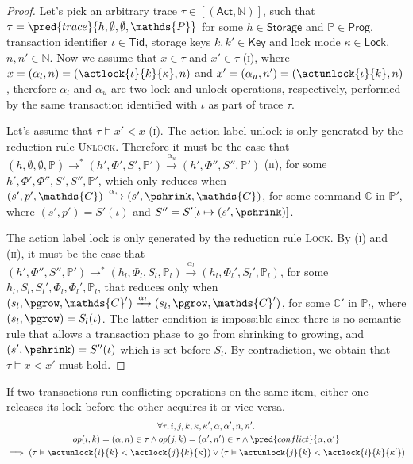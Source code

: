 \begin{proof}
Let's pick an arbitrary trace $\tau \in [(\mathsf{Act}, \mathds{N})]$, such that $\tau = \pred{trace}{h, \emptyset, \emptyset, \mathds{P}}$ for some $h \in \mathsf{Storage}$ and $\mathds{P} \in \mathsf{Prog}$, transaction identifier $\iota \in \mathsf{Tid}$, storage keys $k, k' \in \mathsf{Key}$ and lock mode $\kappa \in \mathsf{Lock}$, $n, n' \in \mathds{N}$. Now we assume that  $x \in \tau$ and $x' \in \tau$ (\textsc{i}), where $x = (\alpha_l, n) = (\actlock{\iota}{k}{\kappa}, n)$ and $x' = (\alpha_u, n') = (\actunlock{\iota}{k}, n)$, therefore $\alpha_l$ and $\alpha_u$ are two lock and unlock operations, respectively, performed by the same transaction identified with $\iota$ as part of trace $\tau$.

Let's assume that $\tau \vDash x' < x$ (\textsc{i}). The action label \textsf{unlock} is only generated by the reduction rule \textsc{Unlock}. Therefore it must be the case that $(h, \emptyset, \emptyset, \mathds{P}) \rightarrow^* (h', \Phi', S', \mathds{P}') \xrightarrow{\alpha_u} (h', \Phi'', S'', \mathds{P}')$ (\textsc{ii}), for some $h', \Phi', \Phi'', S', S'', \mathds{P}'$, which only reduces when $(s', p', \mathds{C}) \xrightarrow{\alpha_u} (s', \pshrink, \mathds{C})$, for some command $\mathds{C}$ in $\mathds{P}'$, where $(s', p') = S'(\iota)$ and $S'' = S'[\iota \mapsto (s', \pshrink)]$.

The action label \textsf{lock} is only generated by the reduction rule \textsc{Lock}. By (\textsc{i}) and (\textsc{ii}), it must be the case that $(h', \Phi'', S'', \mathds{P}') \rightarrow^* (h_l, \Phi_l, S_l, \mathds{P}_l) \xrightarrow{\alpha_l} (h_l, \Phi_l', S_l', \mathds{P}_l)$, for some $h_l, S_l, S_l', \Phi_l, \Phi_l', \mathds{P}_l$, that reduces only when $(s_l, \pgrow, \mathds{C}') \xrightarrow{\alpha_l} (s_l, \pgrow, \mathds{C}')$, for some $\mathds{C}'$ in $\mathds{P}_l$, where $(s_l, \pgrow) = S_l(\iota)$. The latter condition is impossible since there is no semantic rule that allows a transaction phase to go from shrinking to growing, and $(s', \pshrink) = S''(\iota)$ which is set before $S_l$. By contradiction, we obtain that $\tau \vDash x < x'$ must hold.
\end{proof}

\lem \label{lem:conflict} If two transactions run conflicting operations on the same item, either one releases its lock before the other acquires it or vice versa.
\begin{gather*}
\forall \tau, i, j, k, \kappa, \kappa', \alpha, \alpha', n, n' \ldotp \\
op(i, k) = (\alpha, n) \in \tau \land op(j, k) = (\alpha', n') \in \tau \land \pred{conflict}{\alpha, \alpha'} \\
\implies \left( \tau \vDash \actunlock{i}{k} < \actlock{j}{k}{\kappa} \right) \lor \left( \tau \vDash \actunlock{j}{k} < \actlock{i}{k}{\kappa'} \right)
\end{gather*}

